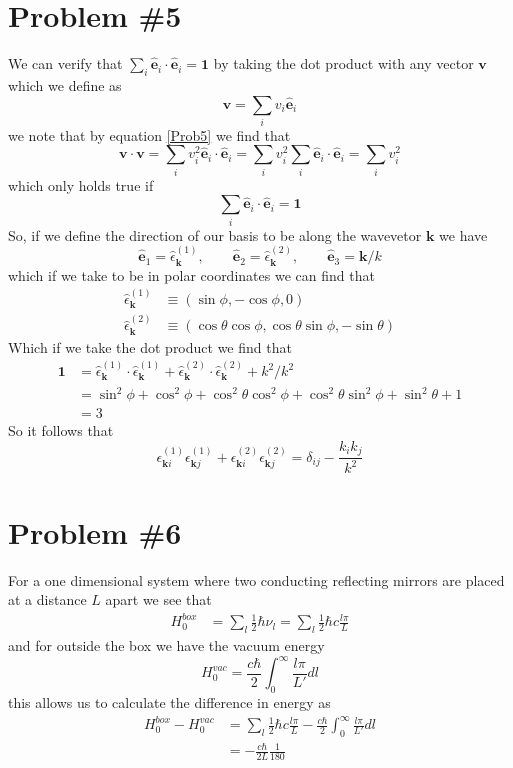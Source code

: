 \documentclass[11pt]{article}
\numberwithin{equation}{section}
\begin{document}
\section{Problem \#5}
We can verify that $\sum_i\hat{\mathbf{e}}_i\cdot\hat{\mathbf{e}}_i = \mathbf{1}$ by taking the dot product with any vector 
$\mathbf{v}$ which we define as
\begin{equation}
    \mathbf{v} = \sum_{i}v_i\hat{\mathbf{e}}_i
    \label{Prob5}
\end{equation}
we note that by equation \ref{Prob5} we find that
    $$\mathbf{v}\cdot\mathbf{v} = \sum_iv_i^2\hat{\mathbf{e}}_i\cdot\hat{\mathbf{e}}_i = \sum_iv_i^2\sum_i\hat{\mathbf{e}}_i\cdot\hat{\mathbf{e}}_i = \sum_{i}v_i^2$$
which only holds true if 
    $$\sum_i\hat{\mathbf{e}}_i\cdot\hat{\mathbf{e}}_i = \mathbf{1}$$
So, if we define the direction of our basis to be along the wavevetor $\mathbf{k}$ we have
    $$\hat{\mathbf{e}}_1 = \hat{\epsilon}_{\mathbf{k}}^{(1)},\qquad
        \hat{\mathbf{e}}_2 = \hat{\epsilon}_{\mathbf{k}}^{(2)},\qquad
        \hat{\mathbf{e}}_3 = \mathbf{k}/k$$
which if we take to be in polar coordinates we can find that 
\begin{align*}
    \hat{\epsilon}_{\mathbf{k}}^{(1)} &\equiv (\sin\phi,-\cos\phi,0)\\
    \hat{\epsilon}_{\mathbf{k}}^{(2)} &\equiv (\cos\theta\cos\phi,\cos\theta\sin\phi,-\sin\theta)
\end{align*}
Which if we take the dot product we find that
\begin{align*}
    \mathbf{1} &= \hat{\epsilon}_{\mathbf{k}}^{(1)}\cdot\hat{\epsilon}_{\mathbf{k}}^{(1)} + \hat{\epsilon}_{\mathbf{k}}^{(2)}\cdot\hat{\epsilon}_{\mathbf{k}}^{(2)} + k^2/k^2\\
      &= \sin^2\phi+\cos^2\phi + \cos^2\theta\cos^2\phi + \cos^2\theta\sin^2\phi + \sin^2\theta + 1\\
      &= 3
\end{align*}
So it follows that
$$\epsilon_{\mathbf{k}i}^{(1)}\epsilon_{\mathbf{k}j}^{(1)} + \epsilon_{\mathbf{k}i}^{(2)}\epsilon_{\mathbf{k}j}^{(2)} = \delta_{ij} - \frac{k_ik_j}{k^2}$$

\pagebreak

\section{Problem \#6}
For a one dimensional system where two conducting reflecting mirrors are placed at a distance $L$ apart we see that
\begin{align*}
    H_0^{box} &= \sum_{l}\frac{1}{2}\hbar\nu_l = \sum_{l}\frac{1}{2}\hbar{c}\frac{l\pi}{L}
\end{align*}
and for outside the box we have the vacuum energy
    $$H_0^{vac} = \frac{c\hbar}{2}\int_{0}^{\infty}\frac{l\pi}{L'}dl$$
this allows us to calculate the difference in energy as
\begin{align*}
    H_0^{box} - H_0^{vac}  &= \sum_{l}\frac{1}{2}\hbar{c}\frac{l\pi}{L} - \frac{c\hbar}{2}\int_{0}^{\infty}\frac{l\pi}{L'}dl\\
                           &= -\frac{c\hbar}{2L}\frac{1}{180}
\end{align*}
\end{document}
